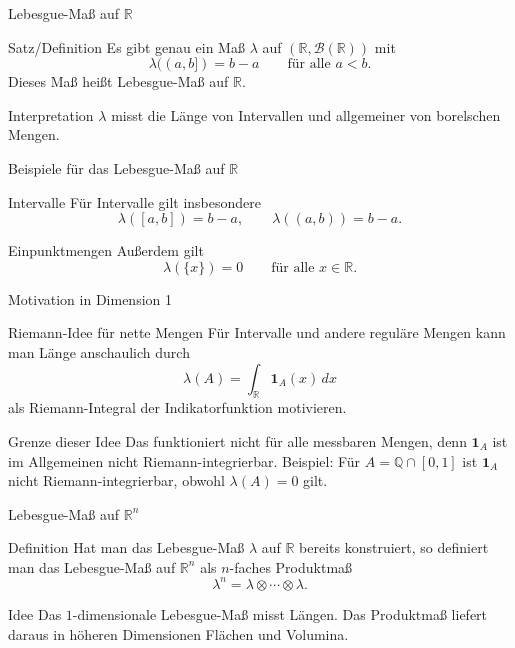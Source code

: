 \documentclass{beamer}
\begin{document}
\begin{frame}{Lebesgue-Maß auf \(\mathbb R\)}
\begin{block}{Satz/Definition}
Es gibt genau ein Maß \(\lambda\) auf \((\mathbb R,\mathcal B(\mathbb R))\) mit
\[
\lambda((a,b])=b-a
\qquad\text{für alle } a<b.
\]
Dieses Maß hei\ss{}t Lebesgue-Maß auf \(\mathbb R\).
\end{block}

\begin{block}{Interpretation}
\(\lambda\) misst die Länge von Intervallen und allgemeiner von borelschen Mengen.
\end{block}
\end{frame}

\begin{frame}{Beispiele für das Lebesgue-Maß auf \(\mathbb R\)}
\begin{block}{Intervalle}
Für Intervalle gilt insbesondere
\[
\lambda([a,b])=b-a,
\qquad
\lambda((a,b))=b-a.
\]
\end{block}

\begin{block}{Einpunktmengen}
Außerdem gilt
\[
\lambda(\{x\})=0
\qquad\text{für alle } x\in\mathbb R.
\]
\end{block}
\end{frame}

\begin{frame}{Motivation in Dimension 1}
\begin{block}{Riemann-Idee für nette Mengen}
Für Intervalle und andere reguläre Mengen kann man Länge anschaulich durch
\[
\lambda(A)=\int_{\mathbb R} \mathbf 1_A(x)\,dx
\]
als Riemann-Integral der Indikatorfunktion motivieren.
\end{block}

\begin{block}{Grenze dieser Idee}
Das funktioniert nicht für alle messbaren Mengen, denn \(\mathbf 1_A\) ist im Allgemeinen
nicht Riemann-integrierbar.
\newline
Beispiel: Für \(A=\mathbb Q\cap[0,1]\) ist \(\mathbf 1_A\) nicht Riemann-integrierbar,
obwohl \(\lambda(A)=0\) gilt.
\end{block}
\end{frame}

\begin{frame}{Lebesgue-Maß auf \(\mathbb R^n\)}
\begin{block}{Definition}
Hat man das Lebesgue-Maß \(\lambda\) auf \(\mathbb R\) bereits konstruiert, so definiert man das Lebesgue-Maß auf \(\mathbb R^n\) als \(n\)-faches Produktmaß
\[
\lambda^n=\lambda\otimes\cdots\otimes\lambda.
\]
\end{block}

\begin{block}{Idee}
Das \(1\)-dimensionale Lebesgue-Maß misst Längen.
Das Produktmaß liefert daraus in höheren Dimensionen Flächen und Volumina.
\end{block}
\end{frame}
\end{document}
